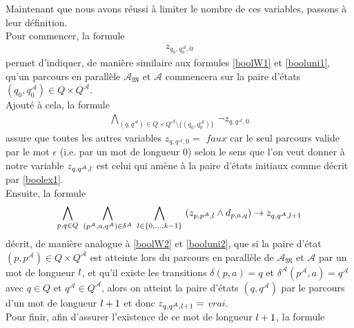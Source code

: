 \documentclass[12pt,a4paper,oneside,titlepage]{report}
\begin{document}
Maintenant que nous avons réussi à limiter le nombre de ces variables, passons à leur définition.\\
Pour commencer, la formule  
\begin{equation}
\label{boolex1}
\begin{aligned}
z_{q_0,q_0^\mathcal{A},0}
\end{aligned}
\end{equation}
permet d'indiquer, de manière similaire aux formules \ref{boolW1} et \ref{booluni1}, qu'un parcours en parallèle $\mathcal{A}_\mathfrak{M}$ et $\mathcal{A}$ commencera sur la paire d'états $(q_0,q_0^\mathcal{A})\in Q\times Q^\mathcal{A}$.\\
Ajouté à cela, la formule 
\begin{equation}
\label{boolex2}
\begin{aligned}
\bigwedge_{(q,q^\mathcal{A})\in Q\times Q^\mathcal{A}\setminus \{(q_0,q_0^\mathcal{A})\}}~ \neg z_{q,q^\mathcal{A},0}
\end{aligned}
\end{equation}
assure que toutes les autres variables $z_{q,q^\mathcal{A},0}=$ $faux$ car le seul parcours valide par le mot $\epsilon$ (i.e. par un mot de longueur $0$) selon le sens que l'on veut donner à notre variable $z_{q,q^\mathcal{A},\mathnormal{l}}$ est celui qui amène à la paire d'états initiaux comme décrit par \ref{boolex1}.\\
Ensuite, la formule
\begin{equation}
\label{boolex3}
\begin{aligned}
\bigwedge_{p,q\in Q}~ \bigwedge_{(p^\mathcal{A},a,q^\mathcal{A})\in\delta^\mathcal{A}}~ \bigwedge_{\mathnormal{l}\in\{0,... ,k-1\}}~ (z_{p,p^\mathcal{A}, \mathnormal{l}}\land d_{p,a,q})\rightarrow z_{q,q^\mathcal{A},\mathnormal{l}+1}
\end{aligned}
\end{equation}
décrit, de manière analogue à \ref{boolW2} et \ref{booluni2}, que si la paire d'état $(p,p^\mathcal{A})\in Q\times Q^\mathcal{A}$ est atteinte lors du parcours en parallèle de $\mathcal{A}_\mathfrak{M}$ et $\mathcal{A}$ par un mot de longueur $\mathnormal{l}$, et qu'il existe les transitions $\delta (p,a)=q$ et $\delta^\mathcal{A}(p^\mathcal{A},a)=q^\mathcal{A}$ avec $q\in Q$ et $q^\mathcal{A}\in Q^\mathcal{A}$, alors on atteint la paire d'états $(q,q^\mathcal{A})$ par le parcours d'un mot de longueur $\mathnormal{l}+1$ et donc $z_{q,q^\mathcal{A},\mathnormal{l}+1}=$ $vrai$.\\
Pour finir, afin d'assurer l'existence de ce mot de longueur $\mathnormal{l}+1$, la formule 
\end{document}
